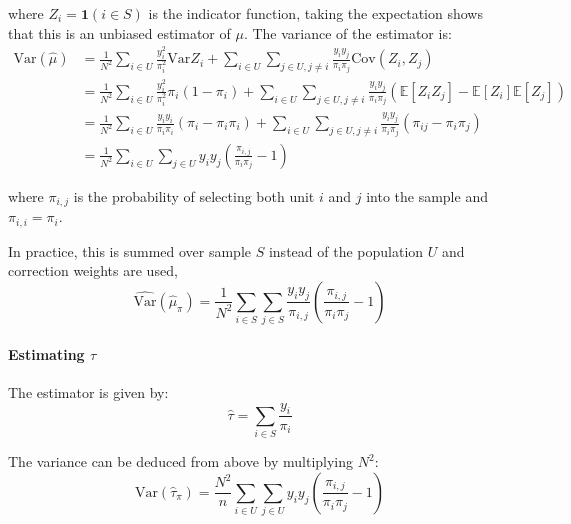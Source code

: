 \documentclass{article}
\begin{document}
where $Z_i=\mathbf{1}(i\in S)$ is the indicator function, taking the expectation shows that this is an unbiased estimator of $\mu$.  The variance of the estimator is:
\begin{align*}
    \mathrm{Var}(\hat{\mu}) &=  \frac{1}{N^2} \sum_{i\in U}\frac{y_{i}^{2}}{\pi_{i}^{2}}\mathrm{Var}Z_{i}+\sum_{i\in U}\sum_{j\in U,j\neq i}\frac{y_{i}y_{j}}{\pi_{i}\pi_{j}}\mathrm{Cov}(Z_{i},Z_{j})\\
    &= \frac{1}{N^2} \sum_{i\in U}\frac{y_{i}^{2}}{\pi_{i}^{2}}\pi_i(1-\pi_i)+\sum_{i\in U}\sum_{j\in U,j\neq i}\frac{y_{i}y_{j}}{\pi_{i}\pi_{j}}(\mathbb{E}[Z_iZ_j]-\mathbb{E}[Z_i]\mathbb{E}[Z_j])\\
    &=\frac{1}{N^2} \sum_{i\in U}\frac{y_{i}y_i}{\pi_{i}\pi_i}(\pi_i-\pi_i\pi_i)+\sum_{i\in U}\sum_{j\in U,j\neq i}\frac{y_{i}y_{j}}{\pi_{i}\pi_{j}}(\pi_{ij} - \pi_i \pi_j)\\
    &=\frac{1}{N^2}\sum_{i\in U}\sum_{j\in U}y_{i}y_{j}\left({\frac{\pi_{i,j}}{\pi_{i}\pi_{j}}}-1\right)
\end{align*}

where $\pi_{i,j}$ is the probability of selecting both unit $i$ and $j$ into the sample and  $\pi_{i,i}=\pi_{i}$. 

In practice, this is summed over sample $S$ instead of the population $U$ and correction weights are used, 
\begin{equation}
    \widehat{\mathrm{Var}}\left(\hat{\mu}_{\pi}\right)=\frac{1}{N^2}\sum_{i\in S}\sum_{j\in S}\frac{y_{i}y_{j}}{\pi_{i,j}}\left(\frac{\pi_{i,j}}{\pi_{i}\pi_{j}}-1\right)
\end{equation}

\paragraph{Estimating $\tau$} The estimator is given by:
\begin{equation}\label{eq:horvitz_thompson_total}
    \hat{\tau} = \sum_{i\in S} \frac{y_i}{\pi_i}
\end{equation}

The variance can be deduced from above by multiplying $N^2$:
\begin{equation}\label{eq:var_horvitz_thompson_total}
    \mathrm{Var}(\hat{\tau}_{\pi}) = \frac{N^2}{n}\sum_{i\in U}\sum_{j\in U}y_{i}y_{j}\left(\frac{\pi_{i,j}}{\pi_{i}\pi_{j}}-1\right)
\end{equation}
\end{document}
